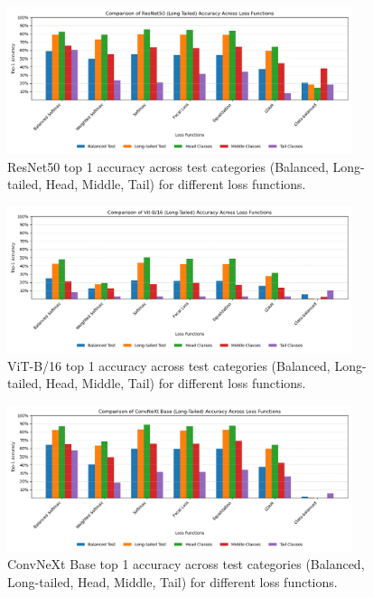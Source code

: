 \begin{figure}[H]
    \centering
    \includegraphics[width=0.9\textwidth]{Images/Plots/resnet_lt_loss_comparison.png}
    \caption{ResNet50 top 1 accuracy across test categories (Balanced, Long-tailed, Head, Middle, Tail) for different loss functions.}
    \label{fig:resnet_lt_loss_comparison}
\end{figure}

\begin{figure}[H]
    \centering
    \includegraphics[width=0.9\textwidth]{Images/Plots/vit_lt_loss_comparison.png}
    \caption{ViT-B/16 top 1 accuracy across test categories (Balanced, Long-tailed, Head, Middle, Tail) for different loss functions.}
    \label{fig:vit_lt_loss_comparison}
\end{figure}

\begin{figure}[H]
    \centering
    \includegraphics[width=0.9\textwidth]{Images/Plots/convnext_lt_loss_comparison.png}
    \caption{ConvNeXt Base top 1 accuracy across test categories (Balanced, Long-tailed, Head, Middle, Tail) for different loss functions.}
    \label{fig:conv_lt_loss_comparison}
\end{figure}

